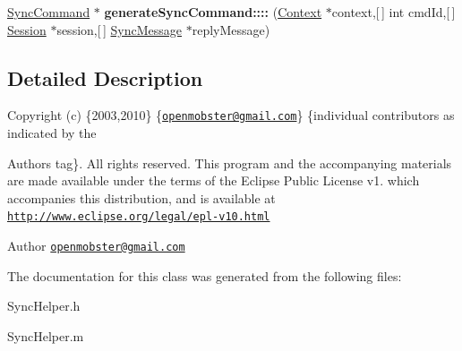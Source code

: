 \begin{DoxyCompactItemize}
\item 
\hypertarget{interface_sync_helper_a064e2513483268fcc2beb49f22eb4ae1}{
\hyperlink{interface_sync_command}{\-Sync\-Command} $\ast$ {\bfseries generate\-Sync\-Command\-::::} (\hyperlink{interface_context}{\-Context} $\ast$context,\mbox{[}$\,$\mbox{]} int cmd\-Id,\mbox{[}$\,$\mbox{]} \hyperlink{interface_session}{\-Session} $\ast$session,\mbox{[}$\,$\mbox{]} \hyperlink{interface_sync_message}{\-Sync\-Message} $\ast$reply\-Message)}
\label{interface_sync_helper_a064e2513483268fcc2beb49f22eb4ae1}

\end{DoxyCompactItemize}


\subsection{\-Detailed \-Description}
\-Copyright (c) \{2003,2010\} \{\href{mailto:openmobster@gmail.com}{\tt openmobster@gmail.\-com}\} \{individual contributors as indicated by the \begin{DoxyAuthor}{\-Authors}
tag\}. \-All rights reserved. \-This program and the accompanying materials are made available under the terms of the \-Eclipse \-Public \-License v1. which accompanies this distribution, and is available at \href{http://www.eclipse.org/legal/epl-v10.html}{\tt http\-://www.\-eclipse.\-org/legal/epl-\/v10.\-html}
\end{DoxyAuthor}
\begin{DoxyAuthor}{\-Author}
\href{mailto:openmobster@gmail.com}{\tt openmobster@gmail.\-com} 
\end{DoxyAuthor}


\-The documentation for this class was generated from the following files\-:\begin{DoxyCompactItemize}
\item 
\-Sync\-Helper.\-h\item 
\-Sync\-Helper.\-m\end{DoxyCompactItemize}
